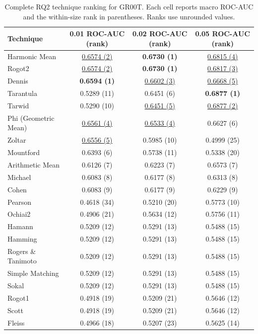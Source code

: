 \begin{table}[t]
\centering
\caption{Complete RQ2 technique ranking for GR00T. Each cell reports macro ROC-AUC and the within-size rank in parentheses. Ranks use unrounded values.}
\label{tab:rq2-supplementary-gr00t}
{\scriptsize
\setlength{\tabcolsep}{7pt}
\renewcommand{\arraystretch}{0.96}
\begin{tabular}{lccc}
\toprule
Technique & 0.01 ROC-AUC (rank) & 0.02 ROC-AUC (rank) & 0.05 ROC-AUC (rank) \\
\midrule
Harmonic Mean & \underline{0.6574 (2)} & \textbf{0.6730 (1)} & \underline{0.6815 (4)} \\
Rogot2 & \underline{0.6574 (2)} & \textbf{0.6730 (1)} & \underline{0.6817 (3)} \\
Dennis & \textbf{0.6594 (1)} & \underline{0.6602 (3)} & \underline{0.6668 (5)} \\
Tarantula & 0.5289 (11) & 0.6451 (6) & \textbf{0.6877 (1)} \\
Tarwid & 0.5290 (10) & \underline{0.6451 (5)} & \underline{0.6877 (2)} \\
Phi (Geometric Mean) & \underline{0.6561 (4)} & \underline{0.6533 (4)} & 0.6627 (6) \\
Zoltar & \underline{0.6556 (5)} & 0.5985 (10) & 0.4999 (25) \\
Mountford & 0.6393 (6) & 0.5738 (11) & 0.5338 (20) \\
Arithmetic Mean & 0.6126 (7) & 0.6223 (7) & 0.6573 (7) \\
Michael & 0.6083 (8) & 0.6177 (8) & 0.6313 (8) \\
Cohen & 0.6083 (9) & 0.6177 (9) & 0.6229 (9) \\
Pearson & 0.4618 (34) & 0.5210 (20) & 0.5773 (10) \\
Ochiai2 & 0.4906 (21) & 0.5634 (12) & 0.5756 (11) \\
Hamann & 0.5209 (12) & 0.5291 (13) & 0.5488 (15) \\
Hamming & 0.5209 (12) & 0.5291 (13) & 0.5488 (15) \\
Rogers \& Tanimoto & 0.5209 (12) & 0.5291 (13) & 0.5488 (15) \\
Simple Matching & 0.5209 (12) & 0.5291 (13) & 0.5488 (15) \\
Sokal & 0.5209 (12) & 0.5291 (13) & 0.5488 (15) \\
Rogot1 & 0.4918 (19) & 0.5209 (21) & 0.5646 (12) \\
Scott & 0.4918 (19) & 0.5209 (21) & 0.5646 (12) \\
Fleiss & 0.4966 (18) & 0.5207 (23) & 0.5625 (14) \\

\end{tabular}}
\end{table}
